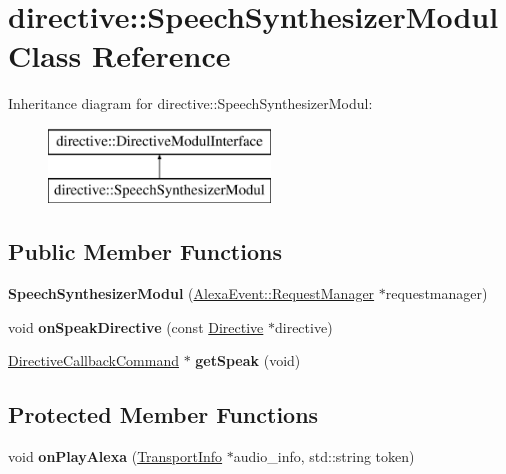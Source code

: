 \hypertarget{classdirective_1_1SpeechSynthesizerModul}{}\section{directive\+:\+:Speech\+Synthesizer\+Modul Class Reference}
\label{classdirective_1_1SpeechSynthesizerModul}
Inheritance diagram for directive\+:\+:Speech\+Synthesizer\+Modul\+:\begin{figure}[H]
\begin{center}
\leavevmode
\includegraphics[height=2.000000cm]{de/da8/classdirective_1_1SpeechSynthesizerModul}
\end{center}
\end{figure}
\subsection*{Public Member Functions}
\begin{DoxyCompactItemize}
\item 
\mbox{\label{classdirective_1_1SpeechSynthesizerModul_a5f34e63ce0bfeb3b7fb85dd674e7a8c1}} 
{\bfseries Speech\+Synthesizer\+Modul} (\hyperlink{classAlexaEvent_1_1RequestManager}{Alexa\+Event\+::\+Request\+Manager} $\ast$requestmanager)
\item 
\mbox{\label{classdirective_1_1SpeechSynthesizerModul_a58c35c36f7e870e15f8fc99990388b81}} 
void {\bfseries on\+Speak\+Directive} (const \hyperlink{classdirective_1_1Directive}{Directive} $\ast$directive)
\item 
\mbox{\label{classdirective_1_1SpeechSynthesizerModul_a04d669a0ed181f4a7ba8fa0c7002e2a5}} 
\hyperlink{classdirective_1_1DirectiveCallbackCommand}{Directive\+Callback\+Command} $\ast$ {\bfseries get\+Speak} (void)
\end{DoxyCompactItemize}
\subsection*{Protected Member Functions}
\begin{DoxyCompactItemize}
\item 
\mbox{\label{classdirective_1_1SpeechSynthesizerModul_a130f43372f446e1fc317a6ebc49a37e2}} 
void {\bfseries on\+Play\+Alexa} (\hyperlink{classAlexaEvent_1_1TransportInfo}{Transport\+Info} $\ast$audio\+\_\+info, std\+::string token)
\end{DoxyCompactItemize}
